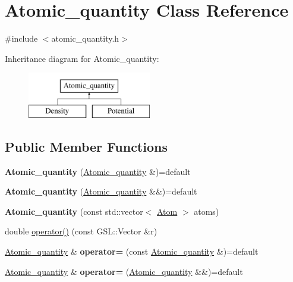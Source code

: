 \hypertarget{classAtomic__quantity}{}\section{Atomic\+\_\+quantity Class Reference}
\label{classAtomic__quantity}


{\ttfamily \#include $<$atomic\+\_\+quantity.\+h$>$}

Inheritance diagram for Atomic\+\_\+quantity\+:\begin{figure}[H]
\begin{center}
\leavevmode
\includegraphics[height=2.000000cm]{classAtomic__quantity}
\end{center}
\end{figure}
\subsection*{Public Member Functions}
\begin{DoxyCompactItemize}
\item 
\mbox{\label{classAtomic__quantity_aec314bd18851f37976c934a9232284ba}} 
{\bfseries Atomic\+\_\+quantity} (\hyperlink{classAtomic__quantity}{Atomic\+\_\+quantity} \&)=default
\item 
\mbox{\label{classAtomic__quantity_a29d6b9948d6fc78643c95fde1a7b0bdd}} 
{\bfseries Atomic\+\_\+quantity} (\hyperlink{classAtomic__quantity}{Atomic\+\_\+quantity} \&\&)=default
\item 
\mbox{\label{classAtomic__quantity_a7b2d3d764b912c188b7adfa46da943e2}} 
{\bfseries Atomic\+\_\+quantity} (const std\+::vector$<$ \hyperlink{classAtom}{Atom} $>$ atoms)
\item 
double \hyperlink{classAtomic__quantity_a5bd9055fdf94e57e54a355d5aa818b6c}{operator()} (const G\+S\+L\+::\+Vector \&r)
\item 
\mbox{\label{classAtomic__quantity_aeac67658ceec0ba08efc12216933382d}} 
\hyperlink{classAtomic__quantity}{Atomic\+\_\+quantity} \& {\bfseries operator=} (const \hyperlink{classAtomic__quantity}{Atomic\+\_\+quantity} \&)=default
\item 
\mbox{\label{classAtomic__quantity_aebbdbfcab61f351c1f43619319d61adc}} 
\hyperlink{classAtomic__quantity}{Atomic\+\_\+quantity} \& {\bfseries operator=} (\hyperlink{classAtomic__quantity}{Atomic\+\_\+quantity} \&\&)=default
\end{DoxyCompactItemize}
